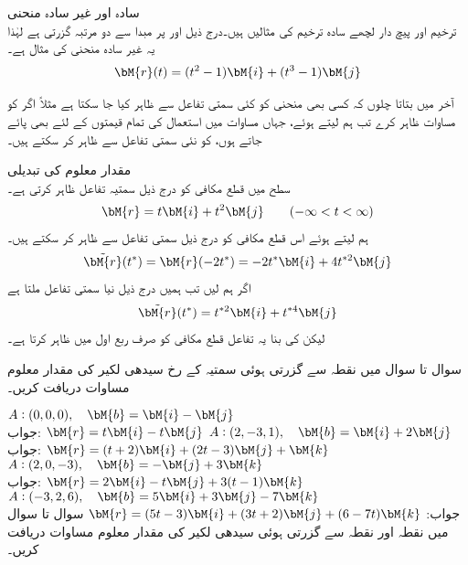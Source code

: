 \quad سادہ اور غیر سادہ منحنی\\
ترخیم اور پیچ دار لچھے سادہ ترخیم کی مثالیں ہیں۔درج ذیل  اور  پر مبدا سے دو مرتبہ گزرتی ہے لہٰذا یہ غیر سادہ منحنی کی مثال ہے۔
\begin{align*}
\bM{r}(t)=(t^2-1)\bM{i}+(t^3-1)\bM{j}
\end{align*}

آخر میں بتاتا چلوں کہ کسی بھی منحنی  کو کئی سمتی تفاعل سے ظاہر کیا جا سکتا ہے مثلاً اگر  کو مساوات  ظاہر کرے تب ہم  لیتے ہوئے، جہاں مساوات  میں استعمال  کی تمام قیمتوں کے لئے   بھی پائے جاتے ہوں،   کو نئی سمتی تفاعل  سے ظاہر کر سکتے ہیں۔

\quad مقدار معلوم کی تبدیلی\\
 سطح میں قطع مکافی  کو درج ذیل سمتیہ تفاعل ظاہر کرتی ہے۔
\begin{align}
\bM{r}=t\bM{i}+t^2\bM{j}\quad \quad (-\infty < t < \infty)
\end{align}
ہم  لیتے ہوئے اس قطع مکافی کو درج ذیل سمتی تفاعل سے ظاہر کر سکتے ہیں۔
\begin{align*}
\tilde{\bM{r}}(t^*)=\bM{r}(-2t^*)=-2t^*\bM{i}+4t^{*2}\bM{j}
\end{align*}
اگر ہم  لیں تب ہمیں درج ذیل نیا سمتی تفاعل ملتا ہے
\begin{align*}
\tilde{\bM{r}}(t^*)=t^{*2}\bM{i}+t^{*4}\bM{j}
\end{align*} 
لیکن  کی بنا یہ تفاعل قطع مکافی کو صرف ربع اول میں ظاہر کرتا ہے۔

سوال  تا سوال  میں نقطہ  سے گزرتی ہوئی سمتیہ  کے رخ سیدھی لکیر کی مقدار معلوم مساوات دریافت کریں۔

\quad 
$A:(0,0,0),\quad \bM{b}=\bM{i}-\bM{j}$\\
جواب:
$\bM{r}=t\bM{i}-t\bM{j}$
\quad 
$A:(2,-3,1),\quad \bM{b}=\bM{i}+2\bM{j}$\\
جواب:
$\bM{r}=(t+2)\bM{i}+(2t-3)\bM{j}+\bM{k}$
\quad 
$A:(2,0,-3),\quad \bM{b}=-\bM{j}+3\bM{k}$\\
جواب:
$\bM{r}=2\bM{i}-t\bM{j}+3(t-1)\bM{k}$
\quad 
$A:(-3,2,6),\quad \bM{b}=5\bM{i}+3\bM{j}-7\bM{k}$\\
جواب:
$\bM{r}=(5t-3)\bM{i}+(3t+2)\bM{j}+(6-7t)\bM{k}$
سوال  تا سوال  میں نقطہ  اور نقطہ  سے گزرتی ہوئی سیدھی لکیر کی مقدار معلوم مساوات دریافت کریں۔

